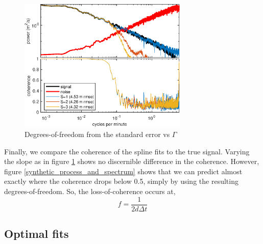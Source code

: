 \documentclass[10pt,journal]{IEEEtran}
\begin{document}
\begin{figure}
  \centerline{\includegraphics[width=19pc,angle=0]{figures/synthetic_process_and_spectrum_slope2degreeVaried}}
  
  \caption{Degrees-of-freedom from the standard error vs $\Gamma$}
  \label{varied_slope}
\end{figure}

Finally, we compare the coherence of the spline fits to the true signal. Varying the slope as in figure \ref{varied_slope} shows no discernible difference in the coherence. However, figure \ref{synthetic_process_and_spectrum} shows that we can predict almost exactly where the coherence drops below 0.5, simply by using the resulting degrees-of-freedom. So, the loss-of-coherence occurs at,
\begin{equation}
    f = \frac{1}{2 d \Delta t}
\end{equation}

\subsection{Optimal fits} \label{optimal_fits}
\end{document}

